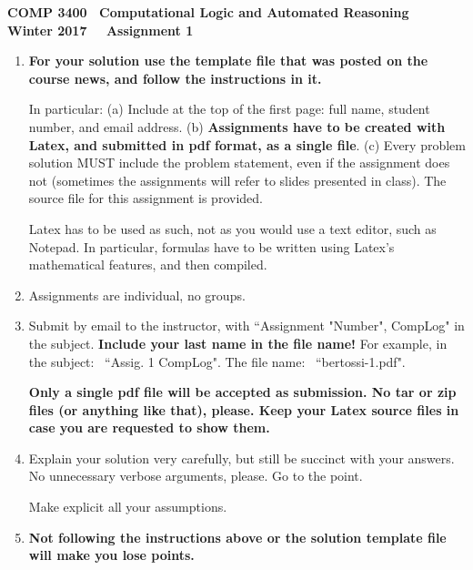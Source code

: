 \documentclass[fullapage,12pt]{article}
\begin{document}
\thispagestyle{empty}

\vspace*{-3.5cm}
\begin{center} \bf \large COMP 3400~ Computational Logic and Automated Reasoning\\ Winter 2017~~ Assignment 1
\end{center}

{\small {}
\begin{enumerate}
\item {\bf \Large For your solution use the template file that was posted on the course news, and follow the instructions in it.}

In particular: (a) Include at the top of the first page: full name, student number, and email address.
(b) {\bf Assignments have to be created with Latex, and submitted in pdf format, as a single file}. (c) Every problem solution MUST include
the problem statement, even if the assignment does not (sometimes the assignments will refer to slides presented in class). The source file for this assignment is provided.

Latex has to be used as such, not as you would use a text editor, such as Notepad. In particular,  formulas have to be written using Latex's mathematical
features, and then compiled.

\item Assignments are individual, no groups.
\item  %
Submit by email to the instructor, with ``Assignment "Number", CompLog" in the subject. {\bf Include your last name in the file name!} For example,
in the subject: \ ``Assig. 1 CompLog". The file name: \ ``bertossi-1.pdf".

{\bf Only a single pdf file will be accepted as submission. No tar or zip files (or anything like that), please. Keep your Latex source files in case you are requested to show them.}

\item Explain your solution very carefully, but still be succinct with your answers. No unnecessary verbose arguments, please. Go to the point.

Make explicit all your assumptions.

\item {\bf Not following the instructions above or the solution template file will make you lose points.}
\end{enumerate}}
\end{document}
